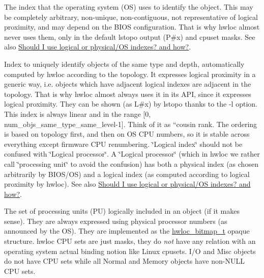 \begin{DoxyDescription}
\item[OS or physical index ]The index that the operating system (OS) uses to identify the object. This may be completely arbitrary, non-\/unique, non-\/contiguous, not representative of logical proximity, and may depend on the B\+I\+OS configuration. That is why hwloc almost never uses them, only in the default lstopo output ({\ttfamily P\#x}) and cpuset masks. See also \hyperlink{a00394_faq_indexes}{Should I use logical or physical/\+OS indexes? and how?}.


\item[Logical index ]Index to uniquely identify objects of the same type and depth, automatically computed by hwloc according to the topology. It expresses logical proximity in a generic way, i.\+e. objects which have adjacent logical indexes are adjacent in the topology. That is why hwloc almost always uses it in its A\+PI, since it expresses logical proximity. They can be shown (as {\ttfamily L\#x}) by {\ttfamily lstopo} thanks to the {\ttfamily -\/l} option. This index is always linear and in the range \mbox{[}0, num\+\_\+objs\+\_\+same\+\_\+type\+\_\+same\+\_\+level-\/1\mbox{]}. Think of it as ``cousin rank.\textquotesingle{}\textquotesingle{} The ordering is based on topology first, and then on OS C\+PU numbers, so it is stable across everything except firmware C\+PU renumbering. \char`\"{}\+Logical index\char`\"{} should not be confused with \char`\"{}\+Logical processor\char`\"{}. A \char`\"{}\+Logical
  processor\char`\"{} (which in hwloc we rather call \char`\"{}processing unit\char`\"{} to avoid the confusion) has both a physical index (as chosen arbitrarily by B\+I\+O\+S/\+OS) and a logical index (as computed according to logical proximity by hwloc). See also \hyperlink{a00394_faq_indexes}{Should I use logical or physical/\+OS indexes? and how?}.


\item[C\+PU set ]The set of processing units (PU) logically included in an object (if it makes sense). They are always expressed using physical processor numbers (as announced by the OS). They are implemented as the \hyperlink{a00205_gaa3c2bf4c776d603dcebbb61b0c923d84}{hwloc\+\_\+bitmap\+\_\+t} opaque structure. hwloc C\+PU sets are just masks, they do {\itshape not} have any relation with an operating system actual binding notion like Linux\textquotesingle{} cpusets. I/O and Misc objects do not have C\+PU sets while all Normal and Memory objects have non-\/\+N\+U\+LL C\+PU sets.



\end{DoxyDescription}
